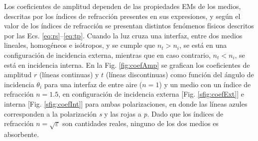 Los coeficientes  de amplitud dependen de las propiedades EMs de los medios, descritas por los índices de refracción presentes en sus expresiones, y según el valor de los índices de refracción se presentan distintos fenómenos físicos descritos por las Ecs. \eqref{eq:rs}--\eqref{eq:tp}. Cuando la luz cruza una interfaz, entre dos medios lineales, homogéneos e isótropos, y se cumple que $n_t>n_i$, se está en una configuración de incidencia externa, mientras que en caso contrario, $n_t<n_i$, se está en  incidencia interna. En la Fig. \ref{fig:coefAmp} se grafican los coeficientes de amplitud $r$ (líneas continuas) y $t$ (líneas discontinuas) como función del ángulo de incidencia $\theta_i$ para una interfaz de entre aire ($n= 1$) y un medio con un índice de refracción $n = 1.5$, en configuración de incidencia externa [Fig. \ref{sfig:coefExt}] e interna [Fig. \ref{sfig:coefInt}] para ambas polarizaciones, en donde las líneas azules corresponden a la polarización \emph{s} y las rojas a \emph{p}. Dado que los índices de refracción $n = \sqrt{\varepsilon}$ son cantidades reales, ninguno de los dos medios es absorbente. 
%
